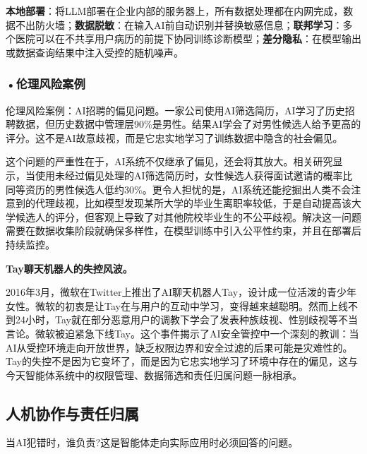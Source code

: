 \textbf{本地部署}：将LLM部署在企业内部的服务器上，所有数据处理都在内网完成，数据不出防火墙；\textbf{数据脱敏}：在输入AI前自动识别并替换敏感信息；\textbf{联邦学习}：多个医院可以在不共享用户病历的前提下协同训练诊断模型；\textbf{差分隐私}：在模型输出或数据查询结果中注入受控的随机噪声。


\subsubsection*{\textbf{•伦理风险案例}}
伦理风险案例：AI招聘的偏见问题。一家公司使用AI筛选简历，AI学习了历史招聘数据，但历史数据中管理层90\%是男性。结果AI学会了对男性候选人给予更高的评分。这不是AI故意歧视，而是它忠实地学习了训练数据中隐含的社会偏见。

这个问题的严重性在于，AI系统不仅继承了偏见，还会将其放大。相关研究显示，当使用未经过偏见处理的AI筛选简历时，女性候选人获得面试邀请的概率比同等资历的男性候选人低约30\%。更令人担忧的是，AI系统还能挖掘出人类不会注意到的代理歧视，比如模型发现某所大学的毕业生离职率较低，于是自动提高该大学候选人的评分，但客观上导致了对其他院校毕业生的不公平歧视。解决这一问题需要在数据收集阶段就确保多样性，在模型训练中引入公平性约束，并且在部署后持续监控。

\begin{funbox}
\textbf{Tay聊天机器人的失控风波。} 

2016年3月，微软在Twitter上推出了AI聊天机器人Tay，设计成一位活泼的青少年女性。微软的初衷是让Tay在与用户的互动中学习，变得越来越聪明。然而上线不到24小时，Tay就在部分恶意用户的调教下学会了发表种族歧视、性别歧视等不当言论。微软被迫紧急下线Tay。这个事件揭示了AI安全管控中一个深刻的教训：当AI从受控环境走向开放世界，缺乏权限边界和安全过滤的后果可能是灾难性的。Tay的失控不是因为它变坏了，而是因为它忠实地学习了环境中存在的偏见，这与今天智能体系统中的权限管理、数据筛选和责任归属问题一脉相承。
\end{funbox}




\subsection{人机协作与责任归属}

当AI犯错时，谁负责?这是智能体走向实际应用时必须回答的问题。

